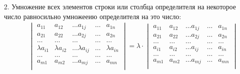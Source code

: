 \documentclass[12pt, fleqn]{extarticle}
\begin{document}
2. Умножение всех элементов строки или столбца определителя на некоторое число \lambda равносильно умножееию определителя на это число:
\begin{align*}
     &  &
    \begin{vmatrix}
        a_{11}         & a_{12}         & \dots a_{1j}         & \dots & a_{1n}         \\
        a_{21}         & a_{22}         & \dots a_{2j}         & \dots & a_{2n}         \\
        \dots          & \dots          & \dots                & \dots & \dots          \\
        \lambda a_{i1} & \lambda a_{i2} & \dots \lambda a_{ij} & \dots & \lambda a_{in} \\
        \dots          & \dots          & \dots                & \dots & \dots          \\
        a_{m1}         & a_{m2}         & \dots a_{mj}         & \dots & a_{mn}         \\
    \end{vmatrix}
    =
    \lambda \cdot
    \begin{vmatrix}
        a_{11} & a_{12} & \dots a_{1j} & \dots & a_{1n} \\
        a_{21} & a_{22} & \dots a_{2j} & \dots & a_{2n} \\
        \dots  & \dots  & \dots        & \dots & \dots  \\
        a_{i1} & a_{i2} & \dots a_{ij} & \dots & a_{in} \\
        \dots  & \dots  & \dots        & \dots & \dots  \\
        a_{m1} & a_{m2} & \dots a_{mj} & \dots & a_{mn} \\
    \end{vmatrix}
\end{align*}
\end{document}
